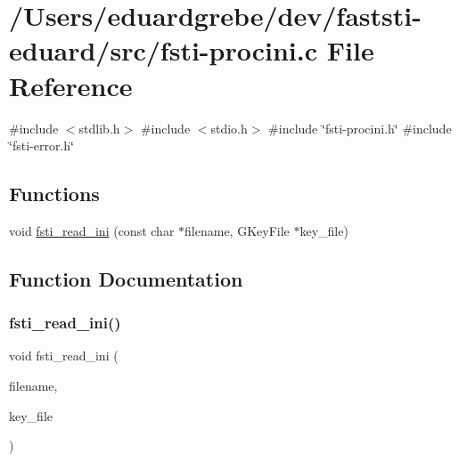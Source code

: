\hypertarget{fsti-procini_8c}{}\section{/\+Users/eduardgrebe/dev/faststi-\/eduard/src/fsti-\/procini.c File Reference}
\label{fsti-procini_8c}
{\ttfamily \#include $<$stdlib.\+h$>$}\newline
{\ttfamily \#include $<$stdio.\+h$>$}\newline
{\ttfamily \#include \char`\"{}fsti-\/procini.\+h\char`\"{}}\newline
{\ttfamily \#include \char`\"{}fsti-\/error.\+h\char`\"{}}\newline
\subsection*{Functions}
\begin{DoxyCompactItemize}
\item 
void \mbox{\hyperlink{fsti-procini_8c_a438ad09d742e78ab09216d2b532f02bd}{fsti\+\_\+read\+\_\+ini}} (const char $\ast$filename, G\+Key\+File $\ast$key\+\_\+file)
\end{DoxyCompactItemize}


\subsection{Function Documentation}
\mbox{\label{fsti-procini_8c_a438ad09d742e78ab09216d2b532f02bd}} 
\subsubsection{\texorpdfstring{fsti\+\_\+read\+\_\+ini()}{fsti\_read\_ini()}}
{\footnotesize\ttfamily void fsti\+\_\+read\+\_\+ini (\begin{DoxyParamCaption}\item[{const char $\ast$}]{filename,  }\item[{G\+Key\+File $\ast$}]{key\+\_\+file }\end{DoxyParamCaption})}


